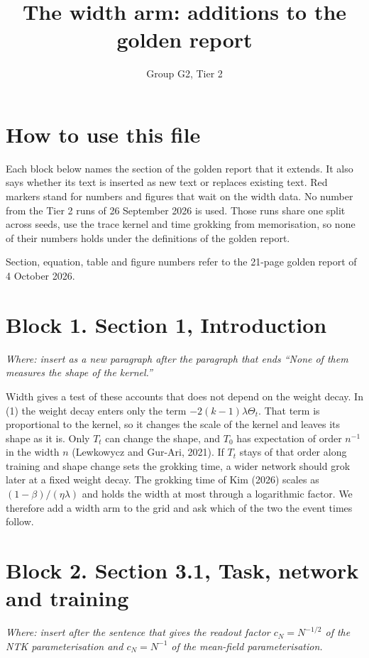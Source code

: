 \documentclass[a4paper,11pt]{article} %
\newcommand{\citepas}[2]{(#2)}
\newcommand{\citetas}[2]{#2}
\newcommand{\gref}[2]{#2}
\newcommand{\where}[1]{\par\smallskip\noindent\textit{\small Where: #1}\par\smallskip}
\begin{document}
\title{The width arm: additions to the golden report}
\author{Group G2, Tier 2}
\date{}
\maketitle

\section*{How to use this file}

Each block below names the section of the golden report that it extends. It
also says whether its text is inserted as new text or replaces existing text.
Red markers stand for numbers and figures that wait on the width data. No
number from the Tier 2 runs of 26 September 2026 is used. Those runs share one
split across seeds, use the trace kernel and time grokking from memorisation,
so none of their numbers holds under the definitions of the golden report.

Section, equation, table and figure numbers refer to the 21-page golden report
of 4 October 2026.

\section*{Block 1. Section 1, Introduction}
\where{insert as a new paragraph after the paragraph that ends ``None of them
measures the shape of the kernel.''}

Width gives a test of these accounts that does not depend on the weight decay.
In \gref{eq:kernelflow}{(1)} the weight decay enters only the term
$-2(k-1)\lambda\Theta_t$. That term is proportional to the kernel, so it
changes the scale of the kernel and leaves its shape as it is. Only $T_t$ can
change the shape, and $T_0$ has expectation of order $n^{-1}$ in the width $n$
\citepas{lewkowyczTrainingDynamicsDeep2021}{Lewkowycz and Gur-Ari, 2021}. If
$T_t$ stays of that order along training and shape change sets the grokking
time, a wider network should grok later at a fixed weight decay. The grokking
time of \citetas{kimGrokkingWeightDecayClock2026}{Kim (2026)} scales as
$(1-\beta)/(\eta\lambda)$ and holds the width at most through a logarithmic
factor. We therefore add a width arm to the grid and ask which of the two the
event times follow.

\section*{Block 2. Section 3.1, Task, network and training}
\where{insert after the sentence that gives the readout factor
$c_N=N^{-1/2}$ of the NTK parameterisation and $c_N=N^{-1}$ of the mean-field
parameterisation.}
\end{document}
